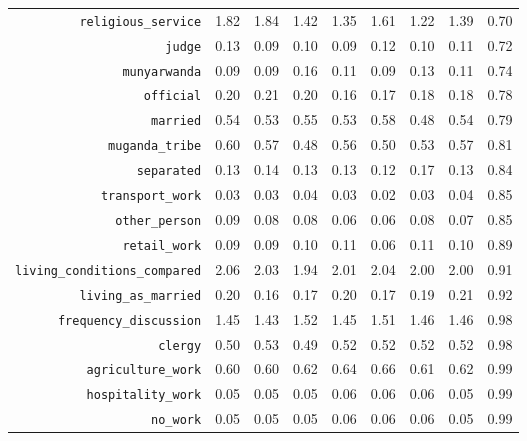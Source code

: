 \begin{longtable}{rrrrrrrrr}
  {\texttt{religious\_service}} & 1.82 & 1.84 & 1.42 & 1.35 & 1.61 & 1.22 & 1.39 & 0.70 \\ 
  {\texttt{judge}} & 0.13 & 0.09 & 0.10 & 0.09 & 0.12 & 0.10 & 0.11 & 0.72 \\ 
  {\texttt{munyarwanda}} & 0.09 & 0.09 & 0.16 & 0.11 & 0.09 & 0.13 & 0.11 & 0.74 \\ 
  {\texttt{official}} & 0.20 & 0.21 & 0.20 & 0.16 & 0.17 & 0.18 & 0.18 & 0.78 \\ 
  {\texttt{married}} & 0.54 & 0.53 & 0.55 & 0.53 & 0.58 & 0.48 & 0.54 & 0.79 \\ 
  {\texttt{muganda\_tribe}} & 0.60 & 0.57 & 0.48 & 0.56 & 0.50 & 0.53 & 0.57 & 0.81 \\ 
  {\texttt{separated}} & 0.13 & 0.14 & 0.13 & 0.13 & 0.12 & 0.17 & 0.13 & 0.84 \\ 
  {\texttt{transport\_work}} & 0.03 & 0.03 & 0.04 & 0.03 & 0.02 & 0.03 & 0.04 & 0.85 \\ 
  {\texttt{other\_person}} & 0.09 & 0.08 & 0.08 & 0.06 & 0.06 & 0.08 & 0.07 & 0.85 \\ 
  {\texttt{retail\_work}} & 0.09 & 0.09 & 0.10 & 0.11 & 0.06 & 0.11 & 0.10 & 0.89 \\ 
  {\texttt{living\_conditions\_compared}} & 2.06 & 2.03 & 1.94 & 2.01 & 2.04 & 2.00 & 2.00 & 0.91 \\ 
  {\texttt{living\_as\_married}} & 0.20 & 0.16 & 0.17 & 0.20 & 0.17 & 0.19 & 0.21 & 0.92 \\ 
  {\texttt{frequency\_discussion}} & 1.45 & 1.43 & 1.52 & 1.45 & 1.51 & 1.46 & 1.46 & 0.98 \\ 
  {\texttt{clergy}} & 0.50 & 0.53 & 0.49 & 0.52 & 0.52 & 0.52 & 0.52 & 0.98 \\ 
  {\texttt{agriculture\_work}} & 0.60 & 0.60 & 0.62 & 0.64 & 0.66 & 0.61 & 0.62 & 0.99 \\ 
  {\texttt{hospitality\_work}} & 0.05 & 0.05 & 0.05 & 0.06 & 0.06 & 0.06 & 0.05 & 0.99 \\ 
  {\texttt{no\_work}} & 0.05 & 0.05 & 0.05 & 0.06 & 0.06 & 0.06 & 0.05 & 0.99 \\ 
   \hline
\hline
\end{longtable}

